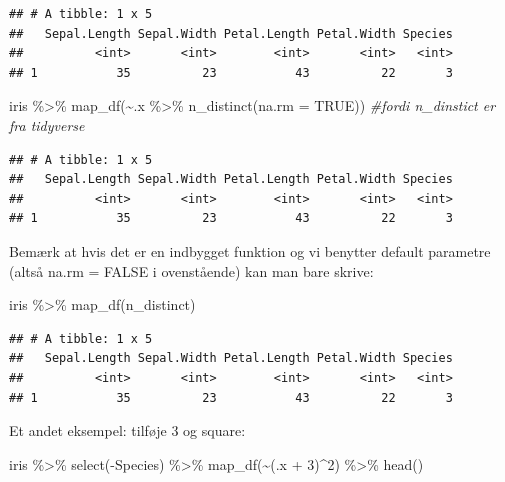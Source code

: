 \documentclass[
]{book}
\newenvironment{Shaded}{\begin{snugshade}}{\end{snugshade}}
\newcommand{\AttributeTok}[1]{\textcolor[rgb]{0.77,0.63,0.00}{#1}}
\newcommand{\CommentTok}[1]{\textcolor[rgb]{0.56,0.35,0.01}{\textit{#1}}}
\newcommand{\ConstantTok}[1]{\textcolor[rgb]{0.00,0.00,0.00}{#1}}
\newcommand{\DecValTok}[1]{\textcolor[rgb]{0.00,0.00,0.81}{#1}}
\newcommand{\FunctionTok}[1]{\textcolor[rgb]{0.00,0.00,0.00}{#1}}
\newcommand{\NormalTok}[1]{#1}
\newcommand{\SpecialCharTok}[1]{\textcolor[rgb]{0.00,0.00,0.00}{#1}}
\begin{document}
\begin{verbatim}
## # A tibble: 1 x 5
##   Sepal.Length Sepal.Width Petal.Length Petal.Width Species
##          <int>       <int>        <int>       <int>   <int>
## 1           35          23           43          22       3
\end{verbatim}

\begin{Shaded}
\begin{Highlighting}[]
\NormalTok{iris }\SpecialCharTok{\%\textgreater{}\%}
  \FunctionTok{map\_df}\NormalTok{(}\SpecialCharTok{\textasciitilde{}}\NormalTok{.x }\SpecialCharTok{\%\textgreater{}\%} \FunctionTok{n\_distinct}\NormalTok{(}\AttributeTok{na.rm =} \ConstantTok{TRUE}\NormalTok{)) }\CommentTok{\#fordi n\_dinstict er fra tidyverse}
\end{Highlighting}
\end{Shaded}

\begin{verbatim}
## # A tibble: 1 x 5
##   Sepal.Length Sepal.Width Petal.Length Petal.Width Species
##          <int>       <int>        <int>       <int>   <int>
## 1           35          23           43          22       3
\end{verbatim}

Bemærk at hvis det er en indbygget funktion og vi benytter default parametre (altså na.rm = FALSE i ovenstående) kan man bare skrive:

\begin{Shaded}
\begin{Highlighting}[]
\NormalTok{iris }\SpecialCharTok{\%\textgreater{}\%}
  \FunctionTok{map\_df}\NormalTok{(n\_distinct)}
\end{Highlighting}
\end{Shaded}

\begin{verbatim}
## # A tibble: 1 x 5
##   Sepal.Length Sepal.Width Petal.Length Petal.Width Species
##          <int>       <int>        <int>       <int>   <int>
## 1           35          23           43          22       3
\end{verbatim}

Et andet eksempel: tilføje 3 og square:

\begin{Shaded}
\begin{Highlighting}[]
\NormalTok{iris }\SpecialCharTok{\%\textgreater{}\%}
  \FunctionTok{select}\NormalTok{(}\SpecialCharTok{{-}}\NormalTok{Species) }\SpecialCharTok{\%\textgreater{}\%}
  \FunctionTok{map\_df}\NormalTok{(}\SpecialCharTok{\textasciitilde{}}\NormalTok{(.x }\SpecialCharTok{+} \DecValTok{3}\NormalTok{)}\SpecialCharTok{\^{}}\DecValTok{2}\NormalTok{) }\SpecialCharTok{\%\textgreater{}\%} \FunctionTok{head}\NormalTok{()}
\end{Highlighting}
\end{Shaded}
\end{document}
